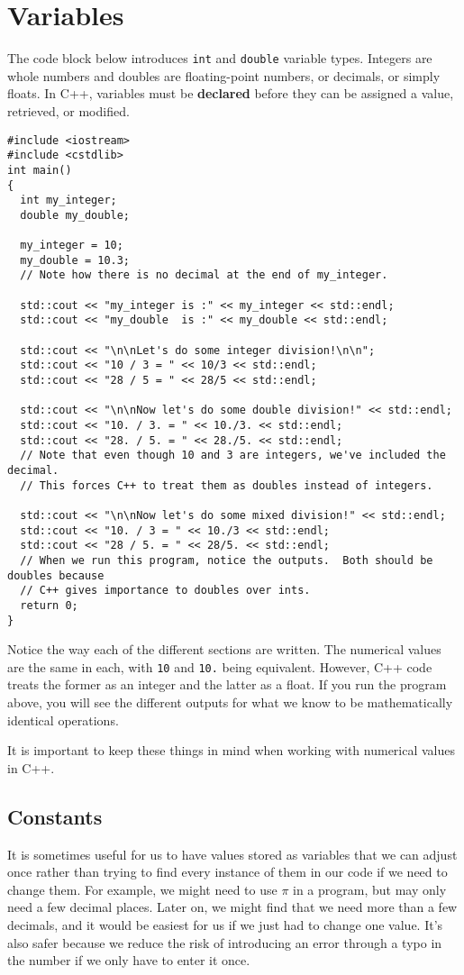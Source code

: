 \section{Variables}
The code block below introduces \texttt{int} and \texttt{double} variable types.  Integers are whole numbers and doubles are floating-point numbers, or decimals, or simply floats.
In C++, variables must be \textbf{declared} before they can be assigned a value, retrieved, or modified.

\begin{verbatim}
#include <iostream>
#include <cstdlib>
int main()
{
  int my_integer;
  double my_double;

  my_integer = 10;
  my_double = 10.3;
  // Note how there is no decimal at the end of my_integer.

  std::cout << "my_integer is :" << my_integer << std::endl;
  std::cout << "my_double  is :" << my_double << std::endl;
  
  std::cout << "\n\nLet's do some integer division!\n\n";
  std::cout << "10 / 3 = " << 10/3 << std::endl;
  std::cout << "28 / 5 = " << 28/5 << std::endl;
  
  std::cout << "\n\nNow let's do some double division!" << std::endl;
  std::cout << "10. / 3. = " << 10./3. << std::endl;
  std::cout << "28. / 5. = " << 28./5. << std::endl;
  // Note that even though 10 and 3 are integers, we've included the decimal.  
  // This forces C++ to treat them as doubles instead of integers.
  
  std::cout << "\n\nNow let's do some mixed division!" << std::endl;
  std::cout << "10. / 3 = " << 10./3 << std::endl;
  std::cout << "28 / 5. = " << 28/5. << std::endl;
  // When we run this program, notice the outputs.  Both should be doubles because 
  // C++ gives importance to doubles over ints.
  return 0;
}
\end{verbatim}
Notice the way each of the different sections are written.  The numerical values are the same in each, with \texttt{10} and \texttt{10.} being equivalent.  However, C++ code treats the former as an integer and the latter as a float.  If you run the program above, you will see the different outputs for what we know to be mathematically identical operations.

It is important to keep these things in mind when working with numerical values in C++.

\subsection*{Constants}
It is sometimes useful for us to have values stored as variables that we can adjust once rather than trying to find every instance of them in our code if we need to change them.  For example, we might need to use $\pi$ in a program, but may only need a few decimal places.  Later on, we might find that we need more than a few decimals, and it would be easiest for us if we just had to change one value.  It's also safer because we reduce the risk of introducing an error through a typo in the number if we only have to enter it once.

